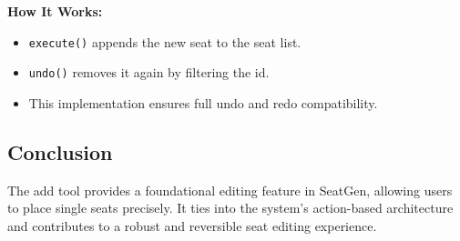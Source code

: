 \textbf{How It Works:}
\begin{itemize}
    \item \texttt{execute()} appends the new seat to the seat list.
    \item \texttt{undo()} removes it again by filtering the id.
    \item This implementation ensures full undo and redo compatibility.
\end{itemize}

\subsection{Conclusion}
The add tool provides a foundational editing feature in SeatGen, allowing users to place single seats precisely. It ties into the system's action-based architecture and contributes to a robust and reversible seat editing experience.
